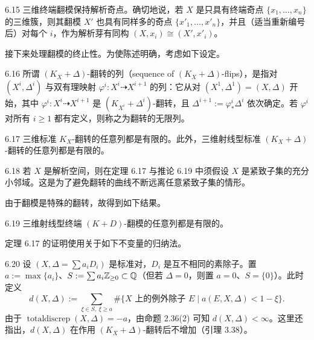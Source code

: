 \begin{theorem*}[{[Kol89]}]{6.15}
三维终端翻模保持解析奇点。确切地说，若 $X$ 是只具有终端奇点 $\{x_1,\dots,x_n\}$ 的三维簇，则其翻模 $X'$ 也具有同样多的奇点 $\{x'_1,\dots,x'_n\}$，并且（适当重新编号后）对每个 $i$，作为解析芽有同构 $(X,x_i)\cong(X',x'_i)$。
\end{theorem*}


接下来处理翻模的终止性。为使陈述明确，考虑如下设定。

\begin{definition}{6.16}
所谓 $(K_X+\Delta)$-翻转的列（sequence of $(K_X+\Delta)$-flips），是指对 $(X^i,\Delta^i)$ 与双有理映射 $\varphi^i:X^i\dashrightarrow X^{i+1}$ 的列：它从对 $(X^1,\Delta^1)=(X,\Delta)$ 开始，其中 $\varphi^i:X^i\dashrightarrow X^{i+1}$ 是 $(K_{X^i}+\Delta^i)$-翻转，且 $\Delta^{i+1}:=\varphi^i_*\Delta^i$ 依次确定。若 $\varphi^i$ 对所有 $i\ge1$ 都有定义，则称之为翻转的无限列。
\end{definition}

\begin{theorem*}[三维标准翻转的终止]{6.17}
三维标准 $K_X$-翻转的任意列都是有限的。此外，三维射线型标准 $(K_X+\Delta)$-翻转的任意列都是有限的。
\end{theorem*}

\begin{remark}{6.18}
若 $X$ 是解析空间，则在定理 6.17 与推论 6.19 中须假设 $X$ 是紧致子集的充分小邻域。这是为了避免翻转的曲线不断远离任意紧致子集的情形。
\end{remark}

由于翻模是特殊的翻转，故得到如下结果。

\begin{corollary}[三维终端翻模的终止]{6.19}
三维射线型终端 $(K+D)$-翻模的任意列都是有限的。
\end{corollary}

定理 6.17 的证明使用关于如下不变量的归纳法。

\begin{definition}{6.20}
设 $(X,\Delta=\sum a_iD_i)$ 是标准对，$D_i$ 是互不相同的素除子。置 $a:=\max\{a_i\}$、$S:=\sum a_i\mathbb{Z}_{\ge0}\subset\mathbb{Q}$（但若 $\Delta=0$，则置 $a=0$、$S=\{0\}$）。此时定义
\[
d(X,\Delta):=\sum_{\xi\in S,\ \xi\ge a}\#\{\text{$X$ 上的例外除子 }E \mid a(E,X,\Delta)<1-\xi\}.
\]
由于 $\operatorname{totaldiscrep}(X,\Delta)=-a$，由命题 2.36(2) 可知 $d(X,\Delta)<\infty$。这里还指出，$d(X,\Delta)$ 在作用 $(K_X+\Delta)$-翻转后不增加（引理 3.38）。
\end{definition}

